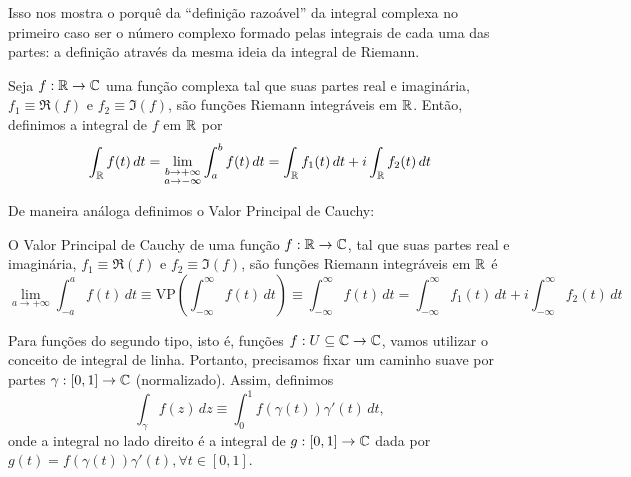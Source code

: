         Isso nos mostra o porquê da ``definição razoável'' da integral complexa no primeiro caso
        ser o número complexo formado pelas integrais de cada uma das partes: a definição através
        da mesma ideia da integral de Riemann.
        \begin{definicao}
        \label{def-integral-complexa-impropria-tipo-1}
            Seja $f:\mathbb{R}\to\mathbb{C}$ uma função complexa tal que suas partes real e imaginária,
            $f_1\equiv\Re(f)$ e $f_2\equiv\Im(f)$, são funções Riemann integráveis em $\mathbb{R}$.
            Então, definimos a integral de $f$ em $\mathbb{R}$ por
            \begin{equation*}
                \int_{\mathbb{R}} f(t) \, dt=\lim_{\substack{b\to +\infty \\ a\to -\infty}}\int_a^b f(t) \, dt
                                    = \int_{\mathbb{R}} f_1(t) \, dt + i\int_{\mathbb{R}} f_2(t) \, dt
            \end{equation*}
        \end{definicao}
        De maneira análoga definimos o Valor Principal de Cauchy:
        \begin{definicao}
        \label{def-valor-principal-integral-complexa-tipo-1}
            O Valor Principal de Cauchy de uma função $f:\mathbb{R}\to\mathbb{C}$, tal que suas partes 
            real e imaginária, $f_1\equiv\Re(f)$ e $f_2\equiv\Im(f)$, são funções Riemann 
            integráveis em $\mathbb{R}$ é
            \begin{equation*}
                \lim_{a\to +\infty} \int_{-a}^a f(t) \, dt
                \equiv \text{VP}\left( \int_{-\infty}^{\infty} f(t) \, dt \right)
                \equiv \int_{-\infty}^{\infty} f(t) \, dt
                = \int_{-\infty}^{\infty} f_1(t) \, dt + i\int_{-\infty}^{\infty} f_2(t) \, dt
            \end{equation*}
        \end{definicao}
        Para funções do segundo tipo, isto é, funções $f:U\subseteq\mathbb{C}\to\mathbb{C}$, vamos utilizar o
        conceito de integral de linha. Portanto, precisamos fixar um caminho suave por partes
        $\gamma:[0,1]\to\mathbb{C}$ (normalizado). Assim, definimos
        \begin{equation}
        \label{def-integral-complexa-tipo-2}
            \int_{\gamma} f(z) \, dz \equiv \int_0^1 f(\gamma(t))\gamma'(t) \, dt,
        \end{equation}
        onde a integral no lado direito é a integral de $g:[0,1]\to\mathbb{C}$ dada por 
        $g(t) = f(\gamma(t))\gamma'(t), \forall t\in [0,1]$.
        
